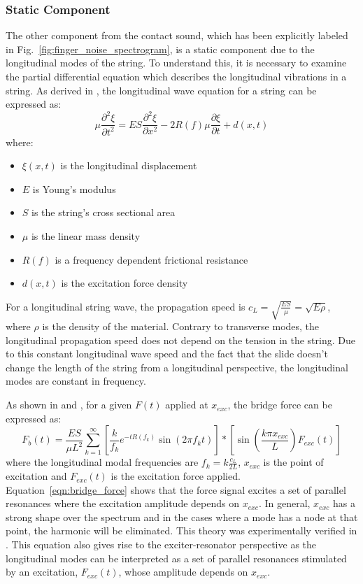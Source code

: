 \documentclass[main.tex]{subfiles}
\begin{document}
\subsubsection{Static Component}
The other component from the contact sound, which has been explicitly labeled in Fig.~\ref{fig:finger_noise_spectrogram}, is a static component due to the longitudinal modes of the string. To understand this, it is necessary to examine the partial differential equation which describes the longitudinal vibrations in a string. As derived in , the longitudinal wave equation for a string can be expressed as:
\begin{equation}
    \mu \frac{\partial^2 \xi}{\partial t^2} = ES\frac{\partial^2 \xi}{\partial x^2} - 2R(f)\mu \frac{\partial \xi}{\partial t} + d(x,t)
    \label{eqn:longitudinal_PDE}
\end{equation}
where:
\begin{itemize}
    \item $\xi(x,t)$ is the longitudinal displacement
    \item $E$ is Young's modulus
    \item $S$ is the string's cross sectional area
    \item $\mu$ is the linear mass density
    \item $R(f)$ is a frequency dependent frictional resistance
    \item $d(x,t)$ is the excitation force density
\end{itemize}

For a longitudinal string wave, the propagation speed is $c_L = \sqrt{\frac{ES}{\mu}} = \sqrt{E \rho}$, where $\rho$ is the density of the material. Contrary to transverse modes, the longitudinal propagation speed does not depend on the tension in the string. Due to this constant longitudinal wave speed and the fact that the slide doesn't change the length of the string from a longitudinal perspective, the longitudinal modes are constant in frequency.

As shown in  and , for a given $F(t)$ applied at $x_{exc}$, the bridge force can be expressed as:
\begin{equation}
    F_b(t) = \frac{ES}{\mu L^2} \sum_{k = 1}^{\infty} \left[\frac{k}{f_k} e^{-t R(f_k)} \sin(2\pi f_k t)\right] \ast \left[ \sin\left(\frac{k \pi x_{exc}}{L}\right) F_{exc}(t)\right]
    \label{eqn:bridge_force}
\end{equation}
where the longitudinal modal frequencies are $f_k = k \frac{c_L}{2L}$, $x_{exc}$ is the point of excitation and $F_{exc}(t)$ is the excitation force applied. Equation~\ref{eqn:bridge_force} shows that the force signal excites a set of parallel resonances where the excitation amplitude depends on $x_{exc}$. In general, $x_{exc}$ has a strong shape over the spectrum and in the cases where a mode has a node at that point, the harmonic will be eliminated. This theory was experimentally verified in . This equation also gives rise to the exciter-resonator perspective as the longitudinal modes can be interpreted as a set of parallel resonances stimulated by an excitation, $F_{exc}(t)$, whose amplitude depends on $x_{exc}$.
\end{document}
